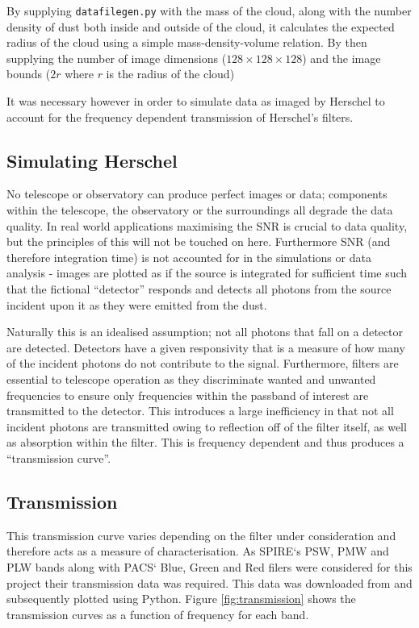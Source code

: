 \documentclass{report}
\begin{document}
By supplying \texttt{datafilegen.py} with the mass of the cloud, along with the number density of dust both inside and outside of the cloud, it calculates the expected radius of the cloud using a simple mass-density-volume relation. By then supplying the number of image dimensions ($128\times128\times128$) and the image bounds ($2r$ where $r$ is the radius of the cloud)

It was necessary however in order to simulate data as imaged by Herschel to account for the frequency dependent transmission of Herschel's filters.

\subsection{Simulating Herschel}
No telescope or observatory can produce perfect images or data; components within the telescope, the observatory or the surroundings all degrade the data quality. In real world applications maximising the SNR is crucial to data quality, but the principles of this will not be touched on here. Furthermore SNR (and therefore integration time) is not accounted for in the simulations or data analysis - images are plotted as if the source is integrated for sufficient time such that the fictional ``detector'' responds and detects all photons from the source incident upon it as they were emitted from the dust.

Naturally this is an idealised assumption; not all photons that fall on a detector are detected. Detectors have a given responsivity that is a measure of how many of the incident photons do not contribute to the signal. Furthermore, filters are essential to telescope operation as they discriminate wanted and unwanted frequencies to ensure only frequencies within the passband of interest are transmitted to the detector. This introduces a large inefficiency in that not all incident photons are transmitted owing to reflection off of the filter itself, as well as absorption within the filter. This is frequency dependent and thus produces a ``transmission curve''.

\subsection{Transmission}
This transmission curve varies depending on the filter under consideration and therefore acts as a measure of characterisation. As SPIRE`s PSW, PMW and PLW bands along with PACS` Blue, Green and Red filers were considered for this project their transmission data was required. This data was downloaded from \textcite{pass} and subsequently plotted using Python. Figure \ref{fig:transmission} shows the transmission curves as a function of frequency for each band.
\end{document}
